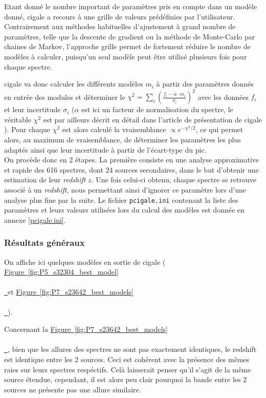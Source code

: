 \documentclass[12pt, a4paper]{article}
\newcommand*{\figref}[2][]{%
  \hyperref[{#2}]{%
    Figure~\ref*{#2}%
    \ifx\\#1\\%
    \else
      \,#1%
    \fi
  }%
}
\begin{document}
Etant donné le nombre important de paramètres pris en compte dans un modèle donné, \gls{cigale} a recours à une grille de valeurs prédéfinies par l'utilisateur. Contrairement aux méthodes habituelles d'ajustement à grand nombre de paramètres, telle que la descente de gradient ou la méthode de Monte-Carlo par chaines de Markov, l'approche grille permet de fortement réduire le nombre de modèles à calculer, puisqu'un seul modèle peut être utilisé plusieurs fois pour chaque spectre.

\gls{cigale} va donc calculer les différents modèles $m_i$ à partir des paramètres donnés en entrée des modules et déterminer le $\chi^2 = \sum_{i} (\frac{f_i - \alpha \cdot m_i}{\sigma_i})^2$ avec les données $f_i$ et leur incertitude $\sigma_i$ ($\alpha$ est ici un facteur de normalisation du spectre, le véritable $\chi^2$ est par ailleurs décrit en détail dans l'article de présentation de \gls{cigale} \parencite{cigale}). Pour chaque $\chi^2$ est alors calculé la vraisemblance $\propto e^{-\chi^2 / 2}$, ce qui permet alors, au maximum de vraisemblance, de déterminer les paramètres les plus adaptés ainsi que leur incertitude à partir de l'écart-type du pic.\\

On procède donc en 2 étapes. La première consiste en une analyse approximative et rapide des 616 spectres, dont 24 sources secondaires, dans le but d'obtenir une estimation de leur \textit{redshift} $z$. Une fois celui-ci obtenu, chaque spectre se retrouve associé à un \textit{redshift}, nous permettant ainsi d'ignorer ce paramètre lors d'une analyse plus fine par la suite. Le fichier \texttt{pcigale.ini} contenant la liste des paramètres et leurs valeurs utilisées lors du calcul des modèles est donnée en annexe \ref{pcigale.ini}.

\subsubsection{Résultats généraux}

On affiche ici quelques modèles en sortie de \gls{cigale} (\figref{fig:P5_s32304_best_model} et \figref{fig:P7_s23642_best_models}).

Concernant la \figref{fig:P7_s23642_best_models}, bien que les allures des spectres ne sont pas exactement identiques, le redshift est identique entre les 2 sources. Ceci est cohérent avec la présence des mêmes raies sur leurs spectres respéctifs. Celà laisserait penser qu'il s'agit de la même source étendue, cependant, il est alors peu clair pourquoi la bande entre les 2 sources ne présente pas une allure similaire.
\end{document}
